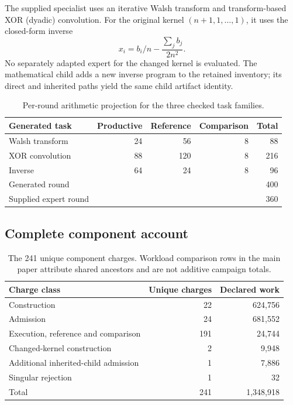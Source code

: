 \documentclass[11pt,a4paper]{article}
\begin{document}
The supplied specialist uses an iterative Walsh transform and transform-based XOR (dyadic) convolution. For the original kernel \((n+1,1,\ldots,1)\), it uses the closed-form inverse
\begin{equation}
x_i=b_i/n-\frac{\sum_jb_j}{2n^2}.
\end{equation}
No separately adapted expert for the changed kernel is evaluated. The mathematical child adds a new inverse program to the retained inventory; its direct and inherited paths yield the same child artifact identity.

\begin{table}[htbp]
\caption{Per-round arithmetic projection for the three checked task families.}\label{tab:roundcost}
\begin{tabularx}{\textwidth}{@{}Y r r r r@{}}
\toprule
Generated task & Productive & Reference & Comparison & Total\\
\midrule
Walsh transform & 24 & 56 & 8 & 88\\
XOR convolution & 88 & 120 & 8 & 216\\
Inverse & 64 & 24 & 8 & 96\\
\midrule
Generated round & & & & 400\\
Supplied expert round & & & & 360\\
\bottomrule
\end{tabularx}
\end{table}

\subsection{Complete component account}
\begin{table}[htbp]
\caption{The 241 unique component charges. Workload comparison rows in the main paper attribute shared ancestors and are not additive campaign totals.}\label{tab:charges}
\begin{tabularx}{\textwidth}{@{}Y r r@{}}
\toprule
Charge class & Unique charges & Declared work\\
\midrule
Construction & 22 & 624,756\\
Admission & 24 & 681,552\\
Execution, reference and comparison & 191 & 24,744\\
Changed-kernel construction & 2 & 9,948\\
Additional inherited-child admission & 1 & 7,886\\
Singular rejection & 1 & 32\\
\midrule
Total & 241 & 1,348,918\\
\bottomrule
\end{tabularx}
\end{table}
\end{document}
